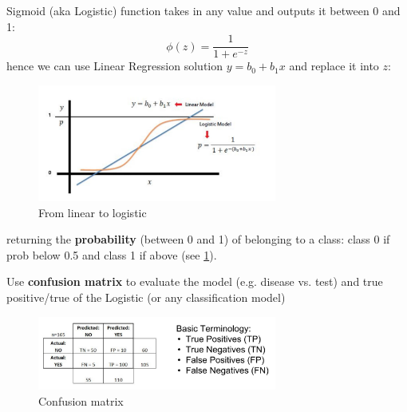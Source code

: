 \documentclass[12pt]{article}
\begin{document}
Sigmoid (aka Logistic) function takes in any value and outputs it between 0 and 1:
\[ \phi(z) = \frac{1}{1+e^{-z}}
\]
hence we can use Linear Regression solution $y=b_0+b_1 x$ and replace it into $z$: 
\begin{figure}[htbp] 
	\centering
	\includegraphics[width=0.7\textwidth]{pics/sigmoid}
	\caption{From linear to logistic}  
	\label{lin_log_regr}
\end{figure}
returning the \textbf{probability} (between 0 and 1) of belonging to a class: class 0 if prob below 0.5 and class 1 if above (see \ref{lin_log_regr}). 

Use \textbf{confusion matrix} to evaluate the model (e.g. disease vs. test) and true positive/true of the Logistic (or any classification model)
\begin{figure}[htbp] 
	\centering
	\includegraphics[width=0.7\textwidth]{pics/confusion_matrix}
	\caption{Confusion matrix}  
\end{figure}
\end{document}
